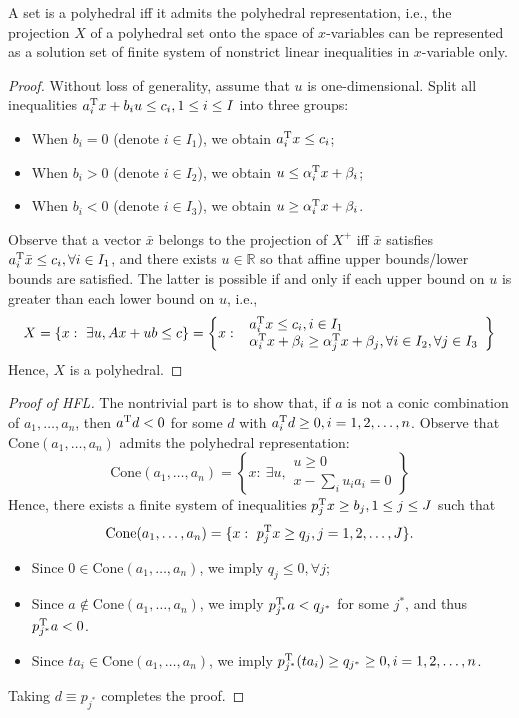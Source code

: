 \begin{proposition}
A set is a polyhedral iff it admits the polyhedral representation, i.e., the projection $X$ of a polyhedral set onto the space of $x$-variables can be represented as a solution set of finite system of nonstrict linear inequalities in $x$-variable only.
\end{proposition}
\begin{proof}
Without loss of generality, assume that $u$ is one-dimensional.
Split all inequalities $a_i^{\mathrm T} x+b_iu\le c_i, 1\le i\le I$ into three groups:
\begin{itemize}
\item
When $b_i=0$ (denote $i\in I_1$), we obtain $a_i^{\mathrm T} x\le c_i$;
\item
When $b_i>0$ (denote $i\in I_2$), we obtain $u\le \alpha_i^{\mathrm T} x+\beta_i$;
\item
When $b_i<0$ (denote $i\in I_3$), we obtain $u\ge \alpha_i^{\mathrm T} x+\beta_i$.
\end{itemize}
Observe that a vector $\bar{x}$ belongs to the projection of $X^+$ iff $\bar{x}$ satisfies 
$a_i^{\mathrm T}\bar{x}\le c_i, \forall i\in I_1$, and there exists $u\in\mathbb{R}$ so that affine upper bounds/lower bounds are satisfied.
The latter is possible if and only if each upper bound on $u$ is greater than each lower bound on $u$, i.e., 
\[
X=\{x:~\exists u, Ax+ub\le c\}
=\left\{
x:~
\begin{array}{l}
a_i^{\mathrm T} x\le c_i, i\in I_1\\
\alpha_i^{\mathrm T} x+\beta_i\ge \alpha_j^{\mathrm T} x+\beta_j, \forall i\in I_2, \forall j\in I_3
\end{array}
\right\}
\]
Hence, $X$ is a polyhedral.
\end{proof}

\begin{proof}[Proof of HFL]
The nontrivial part is to show that, if $a$ is not a conic combination of $a_1,\ldots,a_n$, then $a^{\mathrm T} d<0$ for some $d$ with $a_i^{\mathrm T} d\ge0, i=1,2,\ldots,n$.
Observe that $\text{Cone}(a_1,\ldots,a_n)$ admits the polyhedral representation:
\[
\text{Cone}(a_1,\ldots,a_n)=\left\{
x:~\exists u,
\begin{array}{l}
u\ge0\\
x-\sum_iu_ia_i=0
\end{array}
\right\}
\]
Hence, there exists a finite system of inequalities $p_j^{\mathrm T} x\ge b_j, 1\le j\le J$ such that
\[
\text{Cone}(a_1,\ldots,a_n)=\{x:~p_j^{\mathrm T} x\ge q_j, j=1,2,\ldots,J\}.
\]
\begin{itemize}
\item
Since $0\in\text{Cone}(a_1,\ldots,a_n)$, we imply $q_j\le0, \forall j$;
\item
Since $a\notin\text{Cone}(a_1,\ldots,a_n)$, we imply $p_{j^*}^{\mathrm T} a<q_{j^*}$ for some $j^*$, and thus $p_{j^*}^{\mathrm T} a<0$.
\item
Since $ta_i\in\text{Cone}(a_1,\ldots,a_n)$, we imply $p_{j^*}^{\mathrm T}(ta_i)\ge q_{j^*}\ge0, i=1,2,\ldots,n$.
\end{itemize}
Taking $d\equiv p_{j^*}$ completes the proof.
\end{proof}



